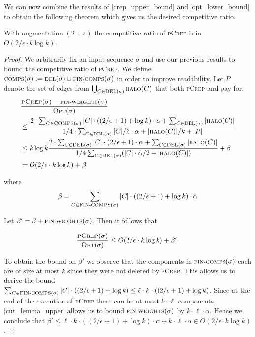 \documentclass[a4paper,UKenglish,cleveref, autoref, thm-restate,authorcolumns]{../lipics/lipics-v2019}
\newcommand{\adjDel}{\textsc{pCrep}}
\newcommand{\del}{\text{\scriptsize DEL}}
\newcommand{\opt}{\text{O{\scriptsize PT}}}
\newcommand{\halo}{\text{\scriptsize HALO}}
\newcommand{\finalComps}{\text{\scriptsize FIN-COMPS}}
\newcommand{\finalWeights}{\text{\scriptsize FIN-WEIGHTS}}
\newcommand{\comps}{\text{\scriptsize COMPS}}
\begin{document}
We can now combine the results of \cref{crep_upper_bound} and \cref{opt_lower_bound} to obtain the following theorem which gives us the desired competitive ratio.

\begin{theorem}
	\label{comp_ratio_theo}
	With augmentation $(2+\epsilon)$ the competitive ratio of \adjDel{} is in $O(2/\epsilon\cdot k \log k)$.
\end{theorem}

\begin{proof}
	We arbitrarily fix an input sequence $\sigma$ and use our previous results to bound the competitive ratio of \adjDel{}. We define $\comps(\sigma):=\del{}(\sigma)\cup\finalComps(\sigma)$ in order to improve readability. Let $P$ denote the set of edges from $\bigcup_{C\in\del{}(\sigma)}\halo{}(C)$ that both \adjDel{} and \opt{} pay for.
	\begingroup
	\addtolength{\jot}{1em}
	\begin{align*}
	&\frac{\adjDel{}(\sigma)-\finalWeights(\sigma)}{\opt(\sigma)}\\ 
	&\leq\frac{2\cdot\sum_{C\in\comps(\sigma)}|C|\cdot((2/\epsilon+1)+\log k)\cdot\alpha +\sum_{C\in\del{}(\sigma)} |\halo(C)|}{1/4\cdot\sum_{C\in\del{}(\sigma)}|C|/k\cdot\alpha+|\halo(C)|/k +|P|}\\
	&\leq k \log k\frac{2\cdot\sum_{C\in\del(\sigma)}|C|\cdot(2/\epsilon+1) \cdot\alpha+\sum_{C\in\del{}(\sigma)}|\halo(C)|}{1/4\sum_{C\in\del{}(\sigma)}(|C|\cdot\alpha/2+|\halo(C)|)}+\beta\\
	& = O(2/\epsilon\cdot k \log k) +\beta
	\end{align*}
	\endgroup
	
	\noindent where
	\begin{align*}
	\beta=\sum_{C\in \finalComps(\sigma)}|C|\cdot((2/\epsilon+1)+\log k)\cdot\alpha
	\end{align*}
	
	\noindent Let $\beta'=\beta+\finalWeights(\sigma)$. Then it follows that
	
	\begin{align*}
	\frac{\adjDel{}(\sigma)}{\opt(\sigma)}\leq O(2/\epsilon\cdot k \log k) +\beta'.
	\end{align*}
	
	To obtain the bound on $\beta'$ we observe that the components in $\finalComps(\sigma)$ each are of size at most $k$ since they were not deleted by \adjDel{}. This allows us to derive the bound $\sum_{C\in \finalComps(\sigma)}|C|\cdot((2/\epsilon+1)+\log k)\leq \ell \cdot k \cdot ((2/\epsilon+1)+\log k)$. Since at the end of the execution of \adjDel{} there can be at most $k\cdot \ell$ components, \cref{cut_lemma_upper} allows us to bound $\finalWeights(\sigma)$ by $k\cdot \ell \cdot\alpha$. Hence we conclude that $\beta'\leq \ell\cdot k \cdot
	((2/\epsilon+1)+\log k)\cdot\alpha+k\cdot \ell\cdot \alpha\in O(2/\epsilon\cdot k \log k)$.
\end{proof}
\end{document}

